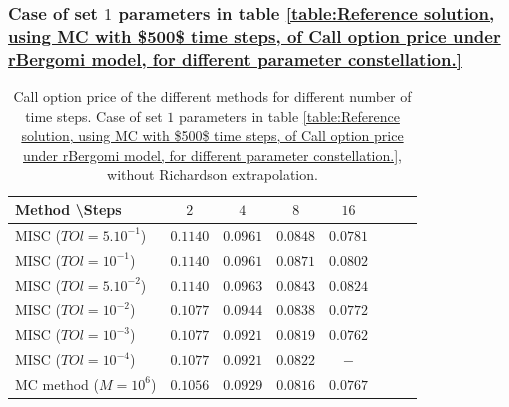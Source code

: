 \documentclass[11pt]{article}
\begin{document}
\subsubsection{Case of set $1$ parameters in table \ref{table:Reference solution, using MC with $500$ time steps, of Call option price under rBergomi model, for different parameter constellation.}}\label{sec:Case of set 1 parameters}


\begin{table}[h!]
	\centering
	\begin{tabular}{l*{6}{c}r}
		Method \textbackslash  Steps            & $2$ & $4$ & $8$ & $16$ &   \\
		\hline
		MISC ($TOl=5.10^{-1}$)  & $0.1140$ & $0.0961$ & $0.0848$ & $0.0781$  \\
		MISC ($TOl=10^{-1}$)  & $0.1140$ & $0.0961$ & $0.0871$ & $0.0802$  \\
		MISC ($TOl=5.10^{-2}$)  & $0.1140$ & $0.0963$ & $0.0843$ & $0.0824$  \\
		MISC ($TOl=10^{-2}$)  & $0.1077$ & $0.0944$ & $0.0838$ & $0.0772$  \\
		MISC ($TOl=10^{-3}$)  & $0.1077$ & $0.0921$ & $0.0819$ & $0.0762$  \\
		MISC ($TOl=10^{-4}$)  & $0.1077$ & $0.0921$ & $0.0822$ & $-$  \\
		\hline
		MC method ($M=10^{6}$)   & $  0.1056$ & $ 0.0929
		$  & $   0.0816
		$ & $ 0.0767$ \\		
		
		\hline
	\end{tabular}
	\caption{ Call option price of the different methods for different number of time steps. Case of set $1$ parameters in table \ref{table:Reference solution, using MC with $500$ time steps, of Call option price under rBergomi model, for different parameter constellation.}, without Richardson extrapolation.}
	\label{table: Call option price of the different methods for different number of time steps. Case set 1}
\end{table}
\end{document}
